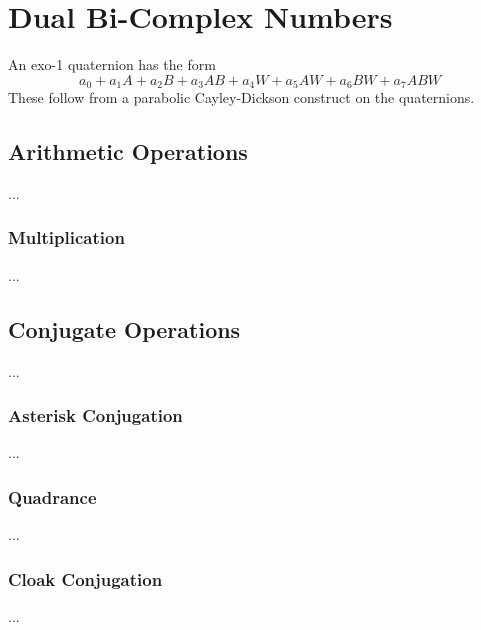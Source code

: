 \chapter{Dual Bi-Complex Numbers}
An exo-1 quaternion has the form
\begin{equation}
    a_{0} + a_{1} A + a_{2} B + a_{3} AB + a_{4} W + a_{5} AW + a_{6} BW + a_{7} ABW
\end{equation}
These follow from a parabolic Cayley-Dickson construct on the quaternions.
\section{Arithmetic Operations}
...
\subsection{Multiplication}
...
\section{Conjugate Operations}
...
\subsection{Asterisk Conjugation}
...
\subsection{Quadrance}
...
\subsection{Cloak Conjugation}
...
